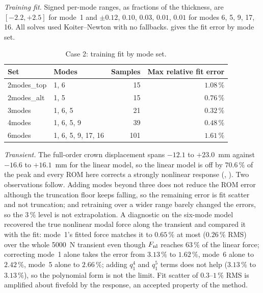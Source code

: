 \emph{Training fit.} Signed per-mode ranges, as fractions of the thickness, are $[-2.2,+2.5]$ for mode~1 and $\pm0.12$, $0.10$, $0.03$, $0.01$, $0.01$ for modes 6, 5, 9, 17, 16. All solves used Koiter--Newton with no fallbacks.  gives the fit error by mode set.

\begin{table}[tbp]
\centering\footnotesize
\caption{Case 2: training fit by mode set.}\label{tab:vf-hy-fit}
\begin{tabular}{@{}llrr@{}}
\toprule
Set & Modes & Samples & Max relative fit error\\
\midrule
2modes\_top & 1, 6 & 15 & $1.08\,\%$\\
2modes\_alt & 1, 5 & 15 & $0.76\,\%$\\
3modes & 1, 6, 5 & 21 & $0.32\,\%$\\
4modes & 1, 6, 5, 9 & 39 & $0.48\,\%$\\
6modes & 1, 6, 5, 9, 17, 16 & 101 & $1.61\,\%$\\
\bottomrule
\end{tabular}
\end{table}

\emph{Transient.} The full-order crown displacement spans $-12.1$ to $+23.0$~mm against $-16.6$ to $+16.1$~mm for the linear model, so the linear model is off by $70.6\,\%$ of the peak and every ROM here corrects a strongly nonlinear response (, ). Two observations follow. Adding modes beyond three does not reduce the ROM error although the truncation floor keeps falling, so the remaining error is fit scatter and not truncation; and retraining over a wider range barely changed the errors, so the $3\,\%$ level is not extrapolation. A diagnostic on the six-mode model recovered the true nonlinear modal force along the transient and compared it with the fit: mode~1's fitted force matches it to $0.65\,\%$ at most ($0.26\,\%$ RMS) over the whole 5000~N transient even though $F_{\rm nl}$ reaches $63\,\%$ of the linear force; correcting mode~1 alone takes the error from $3.13\,\%$ to $1.62\,\%$, mode~6 alone to $2.42\,\%$, mode~5 alone to $2.66\,\%$; adding $q_1^4$ and $q_1^5$ terms does not help ($3.13\,\%$ to $3.13\,\%$), so the polynomial form is not the limit. Fit scatter of $0.3$--$1\,\%$ RMS is amplified about fivefold by the response, an accepted property of the method.

